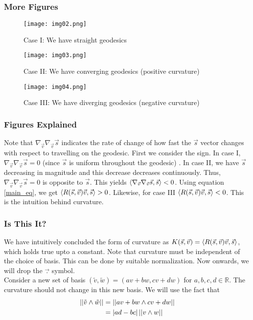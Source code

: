 \begin{frame}
\frametitle{More Figures}
\begin{figure}[!htb]
	\centering
   \begin{minipage}{0.3\textwidth}
     \centering
     \texttt{[image: img02.png]}
     \caption{{Case I: We have straight geodesics}}
     \label{fig:02}
   \end{minipage}
   \begin{minipage}{0.3\textwidth}
     \centering
     \texttt{[image: img03.png]}
     \caption{{Case II: We have converging geodesics (positive curvature)}}
     \label{fig:03}
   \end{minipage}
   \begin{minipage}{0.3\textwidth}
     \centering
     \texttt{[image: img04.png]}
     \caption{{Case III: We have diverging geodesics (negative curvature)}}
     \label{fig:04}
   \end{minipage}
\end{figure}
\end{frame}

\begin{frame}
\frametitle{Figures Explained}
Note that $\nabla_{\vec{v}}\nabla_{\vec{v}} \vec{s}$ indicates the rate of change of how fast the $\vec{s}$ vector changes with respect to travelling on the geodesic. First we consider the sign. In case I, $\nabla_{\vec{v}}\nabla_{\vec{v}} \vec{s}=0$ (since $\vec{s}$ is uniform throughout the geodesic) . In case II, we have $\vec{s}$ decreasing in magnitude and this decrease decreases continuously. Thus, $\nabla_{\vec{v}}\nabla_{\vec{v}} \vec{s}=0$ is opposite to $\vec{s}$. This yields $\left\langle \nabla_{\vec{v}}\nabla_{\vec{v}} \vec{s},\vec{s} \right\rangle<0$. Using equation \ref{main_eq}, we get $\left\langle R(\vec{s},\vec{v}) \vec{v}, \vec{s} \right\rangle>0$. Likewise, for case III $\left\langle R(\vec{s},\vec{v}) \vec{v}, \vec{s} \right\rangle<0$. This is the intuition behind curvature.
\end{frame}

\begin{frame}
\frametitle{Is This It?}
We have intuitively concluded the form of curvature as $K(\vec{s},\vec{v})=\left\langle R(\vec{s},\vec{v}) \vec{v}, \vec{s} \right\rangle$, which holds true upto a constant. Note that curvature must be independent of the choice of basis. This can be done by suitable normalization.
\pause
Now onwards, we will drop the $\vec{.}$ symbol.\\
Consider a new set of basis $(\tilde{v},\tilde{w})=(av+bw,cv+dw)$ for $a,b,c,d\in\mathbb{R}$. The curvature should not change in this new basis. We will use the fact that 
\begin{align}
\left\lvert\left\lvert \tilde{v} \wedge \tilde{w} \right\rvert\right\rvert&=\left\lvert\left\lvert av+bw \wedge cv+dw \right\rvert\right\rvert\\
&=\left\lvert ad-bc \right\rvert\left\lvert\left\lvert v \wedge w \right\rvert\right\rvert
\end{align}
\end{frame}

